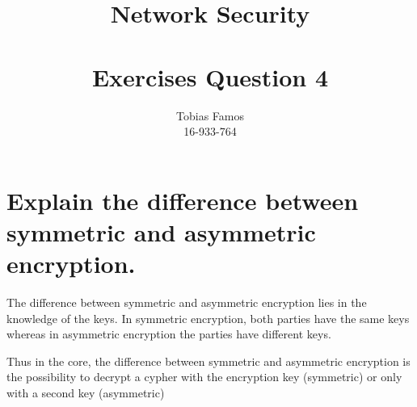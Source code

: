 \documentclass[11pt,a4paper]{article}
\title{Network Security \\ ~\\ \Large{Exercises Question 4}}
\author{Tobias Famos\\ 16-933-764}
\begin{document}
    \maketitle
    \section*{Explain the difference between symmetric and asymmetric encryption.}
    The difference between symmetric and asymmetric encryption lies in the knowledge of the keys.
    In symmetric encryption, both parties have the same keys whereas in asymmetric encryption the parties have different keys.

    Thus in the core, the difference between symmetric and asymmetric encryption is the possibility to decrypt a cypher with the encryption key (symmetric) or only with a second key (asymmetric)
\end{document}
